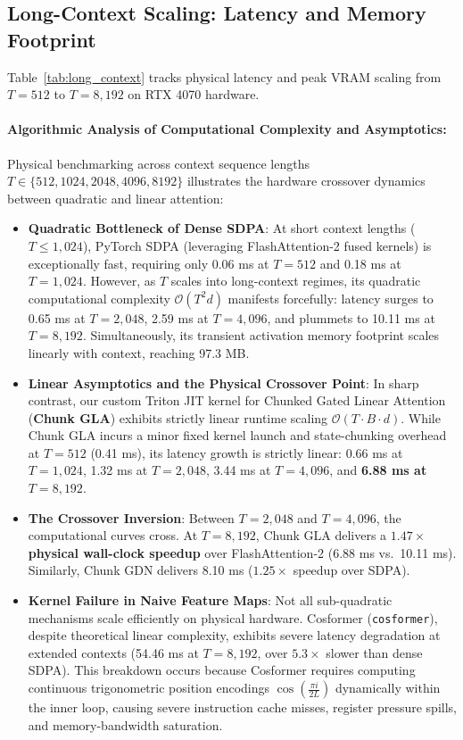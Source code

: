 \documentclass{article}
\begin{document}
\subsection{Long-Context Scaling: Latency and Memory Footprint}
Table~\ref{tab:long_context} tracks physical latency and peak VRAM scaling from $T=512$ to $T=8,192$ on RTX 4070 hardware.



\paragraph{Algorithmic Analysis of Computational Complexity and Asymptotics:}
Physical benchmarking across context sequence lengths $T \in \{512, 1024, 2048, 4096, 8192\}$ illustrates the hardware crossover dynamics between quadratic and linear attention:
\begin{itemize}
    \item \textbf{Quadratic Bottleneck of Dense SDPA}: At short context lengths ($T \le 1,024$), PyTorch SDPA (leveraging FlashAttention-2 \citep{dao2022flashattention,dao2023flashattention2} fused kernels) is exceptionally fast, requiring only 0.06 ms at $T=512$ and 0.18 ms at $T=1,024$. However, as $T$ scales into long-context regimes, its quadratic computational complexity $\mathcal{O}(T^2 d)$ manifests forcefully: latency surges to 0.65 ms at $T=2,048$, 2.59 ms at $T=4,096$, and plummets to 10.11 ms at $T=8,192$. Simultaneously, its transient activation memory footprint scales linearly with context, reaching 97.3 MB.
    \item \textbf{Linear Asymptotics and the Physical Crossover Point}: In sharp contrast, our custom Triton JIT kernel for Chunked Gated Linear Attention (\textbf{Chunk GLA}) exhibits strictly linear runtime scaling $\mathcal{O}(T \cdot B \cdot d)$. While Chunk GLA incurs a minor fixed kernel launch and state-chunking overhead at $T=512$ (0.41 ms), its latency growth is strictly linear: 0.66 ms at $T=1,024$, 1.32 ms at $T=2,048$, 3.44 ms at $T=4,096$, and \textbf{6.88 ms at $T=8,192$}.
    \item \textbf{The Crossover Inversion}: Between $T=2,048$ and $T=4,096$, the computational curves cross. At $T=8,192$, Chunk GLA delivers a \textbf{$1.47\times$ physical wall-clock speedup} over FlashAttention-2 \citep{dao2023flashattention2} (6.88 ms vs.\ 10.11 ms). Similarly, Chunk GDN delivers 8.10 ms ($1.25\times$ speedup over SDPA).
    \item \textbf{Kernel Failure in Naive Feature Maps}: Not all sub-quadratic mechanisms scale efficiently on physical hardware. Cosformer (\texttt{cosformer}), despite theoretical linear complexity, exhibits severe latency degradation at extended contexts (54.46 ms at $T=8,192$, over $5.3\times$ slower than dense SDPA). This breakdown occurs because Cosformer requires computing continuous trigonometric position encodings $\cos\left(\frac{\pi i}{2 L}\right)$ dynamically within the inner loop, causing severe instruction cache misses, register pressure spills, and memory-bandwidth saturation.
\end{itemize}
\end{document}
